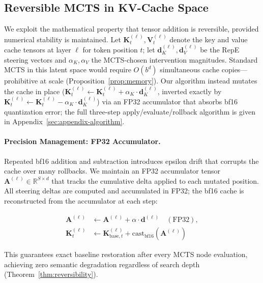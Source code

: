 \subsection{Reversible MCTS in KV-Cache Space}

We exploit the mathematical property that tensor addition is reversible, provided numerical stability is maintained. Let $\mathbf{K}_t^{(\ell)}, \mathbf{V}_t^{(\ell)}$ denote the key and value cache tensors at layer $\ell$ for token position $t$; let $\mathbf{d}_K^{(\ell)}, \mathbf{d}_V^{(\ell)}$ be the RepE steering vectors and $\alpha_K, \alpha_V$ the MCTS-chosen intervention magnitudes. Standard MCTS in this latent space would require $O(b^d)$ simultaneous cache copies---prohibitive at scale (Proposition~\ref{prop:memory}). Our algorithm instead mutates the cache in place ($\mathbf{K}_t^{(\ell)} \leftarrow \mathbf{K}_t^{(\ell)} + \alpha_K \cdot \mathbf{d}_K^{(\ell)}$, inverted exactly by $\mathbf{K}_t^{(\ell)} \leftarrow \mathbf{K}_t^{(\ell)} - \alpha_K \cdot \mathbf{d}_K^{(\ell)}$) via an FP32 accumulator that absorbs bf16 quantization error; the full three-step apply/evaluate/rollback algorithm is given in Appendix~\ref{sec:appendix-algorithm}.

\paragraph{Precision Management: FP32 Accumulator.} Repeated bf16 addition and subtraction introduces epsilon drift that corrupts the cache over many rollbacks. We maintain an FP32 accumulator tensor $\mathbf{A}^{(\ell)} \in \mathbb{R}^{S \times d}$ that tracks the cumulative delta applied to each mutated position. All steering deltas are computed and accumulated in FP32; the bf16 cache is reconstructed from the accumulator at each step:

\begin{equation}
\begin{aligned}
\mathbf{A}^{(\ell)} &\leftarrow \mathbf{A}^{(\ell)} + \alpha \cdot \mathbf{d}^{(\ell)} \quad (\text{FP32}), \\
\mathbf{K}_t^{(\ell)} &\leftarrow \mathbf{K}_{\text{base},t}^{(\ell)} + \text{cast}_{\text{bf16}}(\mathbf{A}^{(\ell)})
\end{aligned}
\label{eq:fp32_accumulator}
\end{equation}

This guarantees exact baseline restoration after every MCTS node evaluation, achieving zero semantic degradation regardless of search depth (Theorem~\ref{thm:reversibility}).

